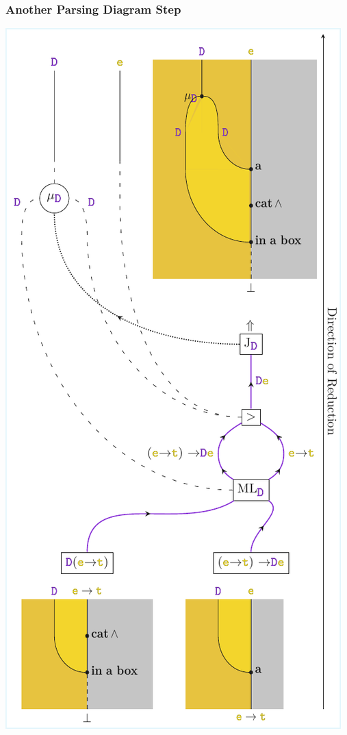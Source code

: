 \documentclass[math, english, info]{beamercours}
\begin{document}
\begin{frame}
	\frametitle{Another Parsing Diagram Step}
	\centering
	\includegraphics[height=.8\textheight]{aux/figures/parsing-diagram2.pdf}
\end{frame}
\end{document}

